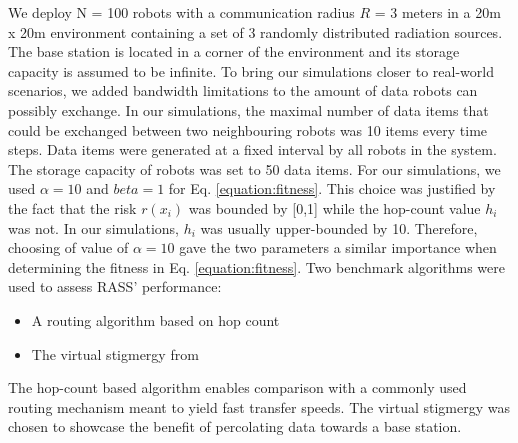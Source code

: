 We deploy N = 100 robots with a communication radius $R$ = 3 meters in a 20m x 20m environment containing a set of 3 randomly distributed radiation sources. The base station is located in a corner of the environment and its storage capacity is assumed to be infinite. To bring our simulations closer to real-world scenarios, we added bandwidth limitations to the amount of data robots can possibly exchange. In our simulations, the maximal number of data items that could be exchanged between two neighbouring robots was 10 items every time steps. Data items were generated at a fixed interval by all robots in the system. The storage capacity of robots was set to 50 data items. For our simulations, we used $\alpha = 10$ and $beta = 1$ for Eq. \ref{equation:fitness}. This choice was justified by the fact that the risk $r({x_i})$ was bounded by [0,1] while the hop-count value $h_i$ was not. In our simulations, $h_i$ was usually upper-bounded by 10. Therefore, choosing of value of $\alpha = 10$ gave the two parameters a similar importance when determining the fitness in Eq. \ref{equation:fitness}. Two benchmark algorithms were used to assess RASS' performance:

\begin{itemize}
    \item A routing algorithm based on hop count 
    \item The virtual stigmergy from \cite{pinciroliTuple2016}
\end{itemize}

The hop-count based algorithm enables comparison with a commonly used routing mechanism meant to yield fast transfer speeds. The virtual stigmergy was chosen to showcase the benefit of percolating data towards a base station.

